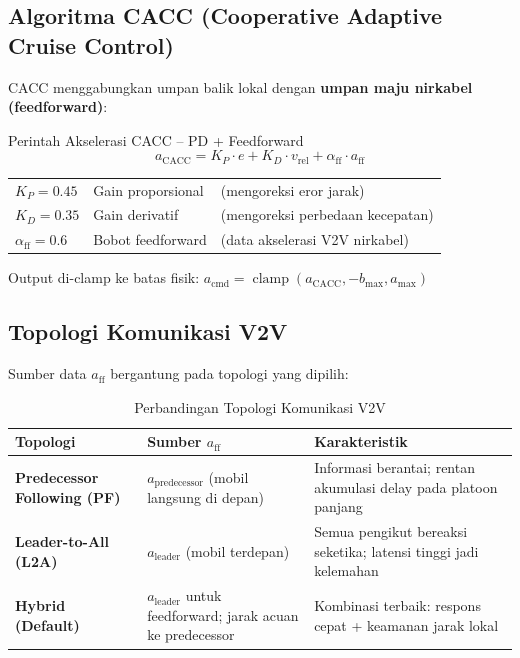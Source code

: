 \documentclass[12pt,a4paper]{article}
\begin{document}
\subsection{Algoritma CACC (Cooperative Adaptive Cruise Control)}

CACC menggabungkan umpan balik lokal dengan \textbf{umpan maju nirkabel (feedforward)}:

\begin{formulabox}{Perintah Akselerasi CACC -- PD + Feedforward}
\begin{equation}
  \boxed{a_{\text{CACC}} = K_P \cdot e + K_D \cdot v_{\text{rel}} + \alpha_{\text{ff}} \cdot a_{\text{ff}}}
  \label{eq:cacc}
\end{equation}
\begin{center}
\begin{tabular}{lll}
  $K_P = 0.45$ & Gain proporsional & (mengoreksi eror jarak) \\
  $K_D = 0.35$ & Gain derivatif & (mengoreksi perbedaan kecepatan) \\
  $\alpha_{\text{ff}} = 0.6$ & Bobot feedforward & (data akselerasi V2V nirkabel) \\
\end{tabular}
\end{center}
Output di-clamp ke batas fisik: $a_{\text{cmd}} = \operatorname{clamp}(a_{\text{CACC}}, -b_{\max}, a_{\max})$
\end{formulabox}

\subsection{Topologi Komunikasi V2V}

Sumber data $a_{\text{ff}}$ bergantung pada topologi yang dipilih:

\begin{table}[ht]
\centering
\caption{Perbandingan Topologi Komunikasi V2V}
\begin{tabularx}{\linewidth}{lXX}
\toprule
\textbf{Topologi} & \textbf{Sumber $a_{\text{ff}}$} & \textbf{Karakteristik} \\
\midrule
\textbf{Predecessor Following (PF)} &
  $a_{\text{predecessor}}$ (mobil langsung di depan) &
  Informasi berantai; rentan akumulasi delay pada platoon panjang \\[0.5em]
\textbf{Leader-to-All (L2A)} &
  $a_{\text{leader}}$ (mobil terdepan) &
  Semua pengikut bereaksi seketika; latensi tinggi jadi kelemahan \\[0.5em]
\textbf{Hybrid (Default)} &
  $a_{\text{leader}}$ untuk feedforward; jarak acuan ke predecessor &
  Kombinasi terbaik: respons cepat + keamanan jarak lokal \\
\bottomrule
\end{tabularx}
\end{table}
\end{document}

